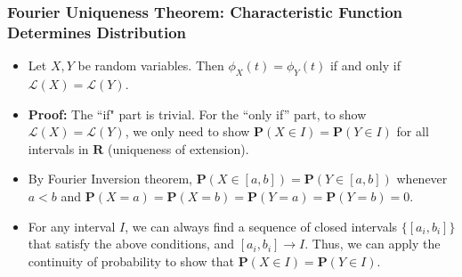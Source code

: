 \documentclass[handout]{beamer}
\newcommand{\BP}{\mathbf{P}}
\begin{document}
\frame
{
  \frametitle{Fourier Uniqueness Theorem: Characteristic Function Determines Distribution} 

 \begin{itemize}
 
  \item<1->[] \begin{Theorem} Let $X, Y$ be random variables. Then $\phi_X(t)=\phi_Y(t)$ if and only if $\mathcal{L}(X)=\mathcal{L} (Y)$.   
   \end{Theorem}
  
  \item<2->\textbf{Proof:} The ``if" part is trivial. For the ``only if'' part, to show $\mathcal{L}(X)=\mathcal{L} (Y)$, we only need to show $\BP(X\in I)=\BP(Y\in I)$ for all intervals in $\mathbf{R}$ (uniqueness of extension). 
  
  \item<3->[-] By Fourier Inversion theorem, $\BP(X\in [a,b])=\BP(Y\in [a,b])$ whenever $a<b$ and $\BP(X=a)=\BP(X=b)=\BP(Y=a)=\BP(Y=b)=0$. 
  \item<4->[-] For any interval $I$, we can always find a sequence of closed intervals $\{[a_i, b_i]\}$ that satisfy the above conditions, and $[a_i,b_i]\rightarrow I$. Thus, we can apply the continuity of probability to show that $\BP(X\in I)=\BP(Y\in I)$.
  
  \end{itemize}
}
\end{document}
